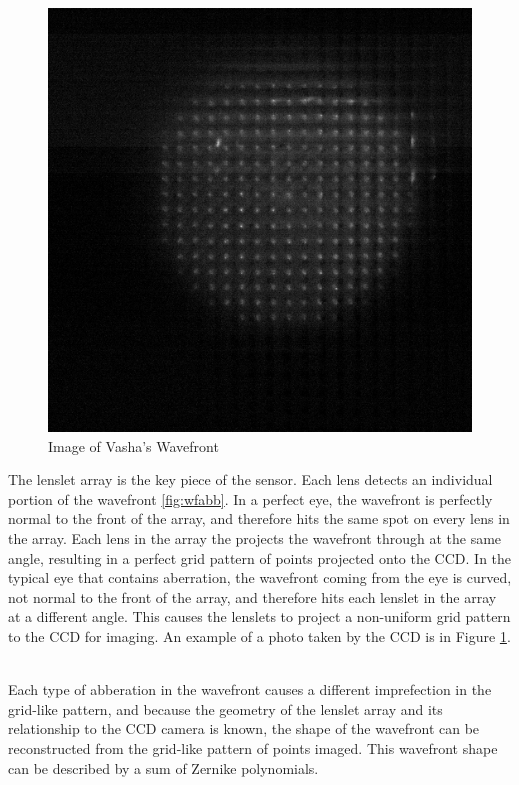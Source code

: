 \documentclass{article}
\begin{document}
\begin{figure}
  \centering
    \includegraphics[width=1\linewidth]{Vasha_R_G_0530_2.png}
  \caption{Image of Vasha's Wavefront}
  \label{fig:wfvasha}
\end{figure}

The lenslet array is the key piece of the sensor. Each lens detects an individual portion of the wavefront \ref{fig:wfabb}. In a perfect eye, the wavefront is perfectly normal to the front of the array, and therefore hits the same spot on every lens in the array. Each lens in the array the projects the wavefront through at the same angle, resulting in a perfect grid pattern of points projected onto the CCD. In the typical eye that contains aberration, the wavefront coming from the eye is curved, not normal to the front of the array, and therefore hits each lenslet in the array at a different angle. This causes the lenslets to project a non-uniform grid pattern to the CCD for imaging.  An example of a photo taken by the CCD is in Figure \ref{fig:wfvasha}. \


 Each type of abberation in the wavefront causes a different imprefection in the grid-like pattern, and because the geometry of the lenslet array and its relationship to the CCD camera is known, the shape of the wavefront can be reconstructed from the grid-like pattern of points imaged. This wavefront shape can be described by a sum of Zernike polynomials.\
 
\end{document}
